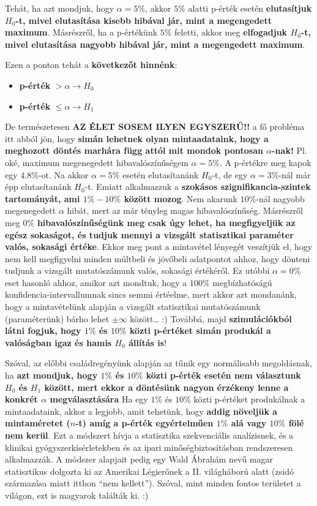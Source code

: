 \documentclass[
]{book}
\providecommand{\tightlist}{%
  \setlength{\itemsep}{0pt}\setlength{\parskip}{0pt}}
\begin{document}
Tehát, ha azt mondjuk, hogy \(\alpha=5\%\), akkor \(5\%\) alatti p-érték esetén \textbf{elutasítjuk \(H_0\)-t, mivel elutasítása kisebb hibával jár, mint a megengedett maximum}. Másrészről, ha a p-értékünk \(5\%\) feletti, akkor meg \textbf{elfogadjuk \(H_0\)-t, mivel elutasítása nagyobb hibával jár, mint a megengedett maximum}.

Ezen a ponton tehát a \textbf{következőt hinnénk}:

\begin{itemize}
\tightlist
\item
  \textbf{p-érték} \(>\alpha \rightarrow H_0\)
\item
  \textbf{p-érték} \(\leq\alpha \rightarrow H_1\)
\end{itemize}

De természetesen \textbf{AZ ÉLET SOSEM ILYEN EGYSZERŰ!!} a fő probléma itt abból jön, hogy \textbf{simán lehetnek olyan mintaadataink, hogy a meghozott döntés marhára függ attól mit mondok pontosan \(\alpha\)-nak!} Pl. oké, maximum megenegedett hibavalószínűségem \(\alpha=5\%\). A p-értékre meg kapok egy \(4.8\%\)-ot. Na akkor \(\alpha=5\%\) esetén elutasítanánk \(H_0\)-t, de egy \(\alpha=3\%\)-nál már épp elutasítanánk \(H_0\)-t.
Emiatt alkalmazzuk a \textbf{szokásos szignifikancia-szintek tartományát, ami \(1\%-10\%\) között mozog}. Nem akarunk \(10\%\)-nál nagyobb megenegedett \(\alpha\) hibát, mert az már tényleg magas hibavalószínűség. Másrészről meg \(0\%\) \textbf{hibavalószínűségünk meg csak úgy lehet, ha megfigyeljük az egész sokaságot, és tudjuk mennyi a vizsgált statisztikai paraméter valós, sokasági értéke}. Ekkor meg pont a mintavétel lényegét veszítjük el, hogy nem kell megfigyelni minden múltbeli és jövőbeli adatpontot ahhoz, hogy dönteni tudjunk a vizsgált mutatószámunk valós, sokasági értékéről. Ez utóbbi \(\alpha=0\%\) eset hasonló ahhoz, amikor azt mondtuk, hogy a \(100\%\) megbízhatóságú konfidencia-intervallumnak sincs semmi értéelme, mert akkor azt mondanánk, hogy a mintavételünk alapján a vizsgált statisztikai mutatószámunk (paraméterünk) bárho lehet \(\pm\infty\) között\ldots{} :)
Továbbá, majd \textbf{szimulációkból látni fogjuk, hogy \(1\%\) és \(10\%\) közti p-értéket simán produkál a valóságban igaz és hamis \(H_0\) állítás is}!

Szóval, az előbbi családregényünk alapján az tűnik egy normálisabb megoldásnak, ha \textbf{azt mondjuk, hogy \(1\%\) és \(10\%\) közti p-érték esetén nem választunk \(H_0\) és \(H_1\) között, mert ekkor a döntésünk nagyon érzékeny lenne a konkrét \(\alpha\) megválasztására}
Ha egy \(1\%\) és \(10\%\) közti p-értéket produkálnak a mintaadataink, akkor a legjobb, amit tehetünk, hogy \textbf{addig növeljük a mintaméretet (\(n\)-t) amíg a p-érték egyértelműen \(1\%\) alá vagy \(10\%\) fölé nem kerül}. Ezt a módszert hívja a statisztika szekvenciális analízisnek, és a klinikai gyógyszerkísérletekben és az ipari minőségbiztosításban rendszeresen alkalmazzák. A módszer alapjait pedig egy Wald Ábrahám nevű magar statisztikus dolgozta ki az Amerikai Légierőnek a II. világháború alatt (zsidó származása miatt itthon ``nem kellett''). Szóval, mint minden fontos területet a világon, ezt is magyarok találták ki. :)
\end{document}
